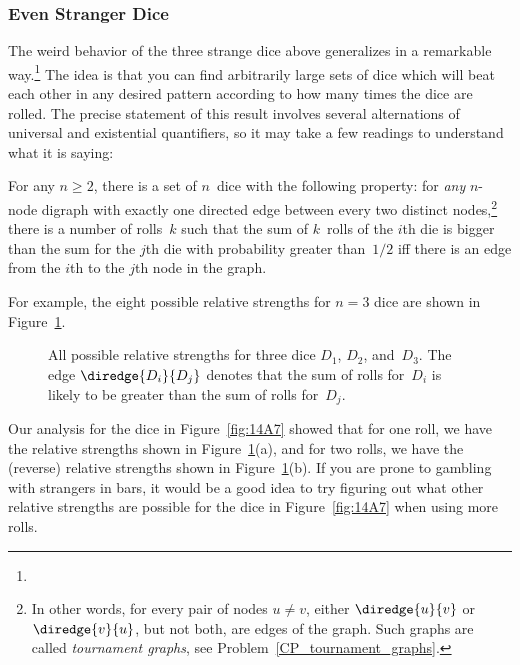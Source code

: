 \subsubsection{Even Stranger Dice}

The weird behavior of the three strange dice above generalizes in a
remarkable way.\footnote{}  The idea is
that you can find arbitrarily large sets of dice which will beat each
other in any desired pattern according to how many times the dice are
rolled.  The precise statement of this result involves several
alternations of universal and existential quantifiers, so it may take
a few readings to understand what it is saying:

\iffalse Now that we know that strange things can happen with strange
dice, it is natural, at least for mathematicians, to ask how strange
things can get.  It turns out that things can get very strange.  In
fact, mathematicians recently made the following discovery:\fi

\begin{theorem}\label{thm:14F2}
For any $n \ge 2$, there is a set of $n$~dice with the following
property: for \emph{any} $n$-node digraph with exactly one directed
edge between every two distinct nodes,\footnote{In other words, for
  every pair of nodes $u \neq v$, either $\diredge{u}{v}$ or
  $\diredge{v}{u}$, but not both, are edges of the graph.  Such graphs
  are called \emph{tournament graphs}, see
  Problem~\ref{CP_tournament_graphs}.} there is a number of rolls~$k$
such that the sum of $k$~rolls of the $i$th die is bigger than the sum
for the $j$th die with probability greater than~$1/2$ iff there is an
edge from the $i$th to the $j$th node in the graph.
\end{theorem}

For example, the eight possible relative strengths for $n =
3$ dice are shown in Figure~\ref{fig:14A13}.  

\begin{figure}


\caption{All possible relative strengths for three dice $D_1$, $D_2$,
  and~$D_3$.  The edge $\diredge{D_i}{D_j}$ denotes that the sum of
  rolls for~$D_i$ is likely to be greater than the sum of rolls
  for~$D_j$.}

\label{fig:14A13}

\end{figure}

Our analysis for the dice in Figure~\ref{fig:14A7} showed that for
one roll, we have the relative strengths shown in
Figure~\ref{fig:14A13}(a), and for two rolls, we have the (reverse)
relative strengths shown in Figure~\ref{fig:14A13}(b).  If you are
prone to gambling with strangers in bars, it would be a good idea to
try figuring out what other relative strengths are possible for the
dice in Figure~\ref{fig:14A7} when using more rolls.


